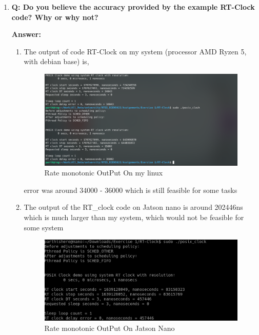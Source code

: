 \documentclass[a4paper,11pt]{article}%
\newenvironment{qanda}{\setlength{\parindent}{0pt}}{\bigskip}
\newcommand{\Q}{\bigskip\bfseries Q: }
\newcommand{\A}{\par\textbf{Answer: } \normalfont}
\begin{document}
\begin{qanda}
\begin{enumerate}
\begin{enumerate}
				\item \Q Do you believe the accuracy provided by the example RT-Clock code? Why or why not?

				\A
				\begin{enumerate}
					\item The output of code RT-Clock on my system (processor AMD Ryzen 5, with debian base) is,
					\begin{figure}[H]
						\centering
						\includegraphics[scale=0.5]{figures/rt_clock_my.png}
						\caption{Rate monotonic OutPut On my linux}
						\label{rmo_on_my_linux}
					\end{figure}
					error was around 34000 - 36000 which is still feasible for some tasks 

					\item The output of the RT\_clock code on Jatson nano is around 202446ns which is much larger than my system, which would not be feasible for some system
					\begin{figure}[H]
						\centering
						\includegraphics[scale=0.5]{figures/nano.png}
						\caption{Rate monotonic OutPut On Jatson Nano}
						\label{rmo_on_my_linux}
					\end{figure}
					
				\end{enumerate}
				

\end{enumerate}
\end{enumerate}
\end{qanda}
\end{document}
